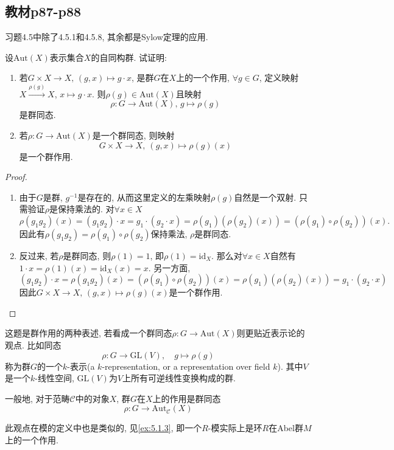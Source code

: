 \subsection{教材p87-p88}
习题4.5中除了4.5.1和4.5.8, 其余都是Sylow定理的应用.

\begin{problem}\label{ex:4.5.1}
    设$\mathrm{Aut}(X)$表示集合$X$的自同构群. 试证明: 
    \begin{enumerate}[(1)]
        \item 若$G \times X \to X,\, (g, x) \mapsto g \cdot x$, 是群$G$在$X$上的一个作用, $\forall g \in G$, 定义映射$X \xrightarrow{\rho(g)} X$, $x \mapsto g \cdot x$. 则$\rho(g) \in \mathrm{Aut}(X)$且映射
        \[
            \rho:G \to \mathrm{Aut}(X),\, g \mapsto \rho(g)
        \]
        是群同态.
        \item 若$\rho:G \to \mathrm{Aut}(X)$是一个群同态, 则映射
        \[
            G \times X \to X,\: (g, x) \mapsto \rho(g)(x)
        \]
        是一个群作用.
    \end{enumerate}
\end{problem}

\begin{proof}
    \begin{enumerate}[(1)]
        \item 由于$G$是群, $g^{-1}$是存在的, 从而这里定义的左乘映射$\rho(g)$自然是一个双射. 只需验证$\rho$是保持乘法的. 对$\forall x \in X$
        \[
            \rho(g_1g_2)(x) = (g_1g_2) \cdot x = g_1 \cdot (g_2 \cdot x) = \rho(g_1)(\rho(g_2)(x)) = (\rho(g_1) \circ \rho(g_2))(x).
        \]
        因此有$\rho(g_1g_2) = \rho(g_1) \circ \rho(g_2)$保持乘法, $\rho$是群同态.
        \item 反过来, 若$\rho$是群同态, 则$\rho(1) = 1$, 即$\rho(1) = \mathrm{id}_X$. 那么对$\forall x \in X$自然有$1 \cdot x = \rho(1)(x) = \mathrm{id}_X(x) = x$. 另一方面,
        \[
            (g_1g_2) \cdot x = \rho(g_1g_2)(x) = (\rho(g_1) \circ \rho(g_2))(x) = \rho(g_1)(\rho(g_2)(x)) = g_1 \cdot (g_2 \cdot x)
        \]
        因此$G \times X \to X,\, (g, x) \mapsto \rho(g)(x)$是一个群作用.
    \end{enumerate}
\end{proof}

\begin{remark}
    这题是群作用的两种表述, 若看成一个群同态$\rho:G \to \mathrm{Aut}(X)$则更贴近表示论的观点. 比如同态
    \[
        \rho:G \to \mathrm{GL}(V),\quad g \mapsto \rho(g)
    \]
    称为群$G$的一个$k$-表示(a $k$-representation, or a representation over field $k$). 其中$V$是一个$k$-线性空间, $\mathrm{GL}(V)$为$V$上所有可逆线性变换构成的群.
    
    一般地, 对于范畴$\mathcal{C}$中的对象$X$, 群$G$在$X$上的作用是群同态
    \[
        \rho:G \to \mathrm{Aut}_{\mathcal{C}}(X)
    \]

    此观点在模的定义中也是类似的, 见\ref{ex:5.1.3}, 即一个$R$-模实际上是环$R$在Abel群$M$上的一个作用.
\end{remark}


